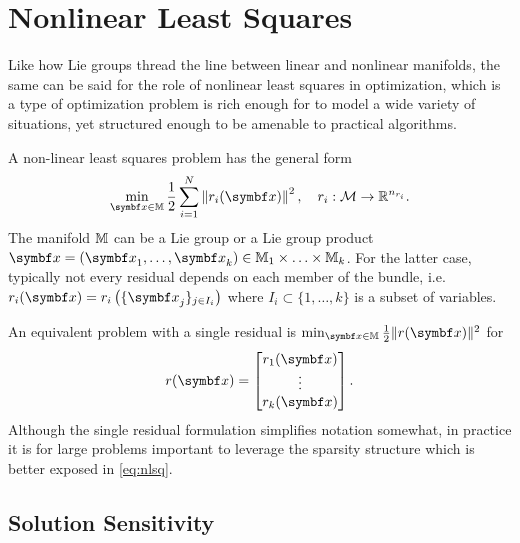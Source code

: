 
\chapter{Nonlinear Least Squares}

Like how Lie groups thread the line between linear and nonlinear manifolds, the same can be said for the role of nonlinear least squares in optimization, which is a type of optimization problem is rich enough for to model a wide variety of situations, yet structured enough to be amenable to practical algorithms.

A non-linear least squares problem has the general form
\begin{equation}
  \label{eq:nlsq}
  \min_{\x \in \M} \frac{1}{2} \sum_{i=1}^{N} \left\| r_{i}(\x) \right\|^{2}, \quad r_{i} : \mathcal M \rightarrow \mathbb{R}^{n_{r_{i}}}.
\end{equation}
The manifold $\mathbb{M}$ can be a Lie group or a Lie group product $\x = (\x_{1}, \ldots, \x_{k}) \in \M_{1} \times \ldots \times \M_{k}$. For the latter case, typically not every residual depends on each member of the bundle, i.e. $r_{i}(\x) = r_{i}\left( \{ \x_{j}\}_{j \in I_{i}} \right)$ where $I_{i} \subset \{ 1, \ldots, k\}$ is a subset of variables.

\begin{remark}
  An equivalent problem with a single residual is $\min_{\x \in \M} \frac{1}{2} \| r(\x) \|^{2}$ for
  \begin{equation}
    r(\x) =
    \begin{bmatrix}
      r_{1}(\x) \\
      \vdots    \\
      r_{k}(\x)
    \end{bmatrix}.
  \end{equation}
  Although the single residual formulation simplifies notation somewhat, in practice it is for large problems important to leverage the sparsity structure which is better exposed in \eqref{eq:nlsq}.
\end{remark}


\section{Solution Sensitivity}


